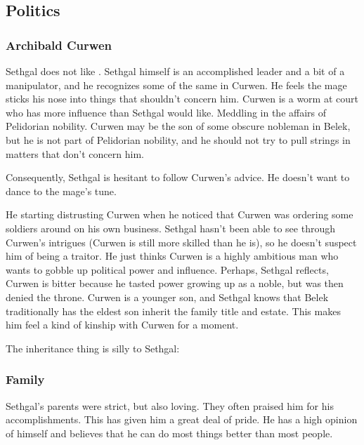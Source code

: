 \subsection{Politics}
\subsubsection{Archibald Curwen}
Sethgal does not like . 
Sethgal himself is an accomplished leader and a bit of a manipulator, and he recognizes some of the same in Curwen. 
He feels the mage sticks his nose into things that shouldn't concern him. 
Curwen is a worm at court who has more influence than Sethgal would like. 
Meddling in the affairs of Pelidorian nobility. 
Curwen may be the son of some obscure nobleman in Belek, but he is not part of Pelidorian nobility, and he should not try to pull strings in matters that don't concern him. 

Consequently, Sethgal is hesitant to follow Curwen's advice. 
He doesn't want to dance to the mage's tune. 

He starting distrusting Curwen when he noticed that Curwen was ordering some soldiers around on his own business. 
Sethgal hasn't been able to see through Curwen's intrigues (Curwen is still more skilled than he is), so he doesn't suspect him of being a traitor. 
He just thinks Curwen is a highly ambitious man who wants to gobble up political power and influence. 
Perhaps, Sethgal reflects, Curwen is bitter because he tasted power growing up as a noble, but was then denied the throne. 
Curwen is a younger son, and Sethgal knows that Belek traditionally has the eldest son inherit the family title and estate. 
This makes him feel a kind of kinship with Curwen for a moment. 

The inheritance thing is silly to Sethgal: 





\subsubsection{Family}
Sethgal's parents were strict, but also loving. 
They often praised him for his accomplishments. 
This has given him a great deal of pride. 
He has a high opinion of himself and believes that he can do most things better than most people. 





